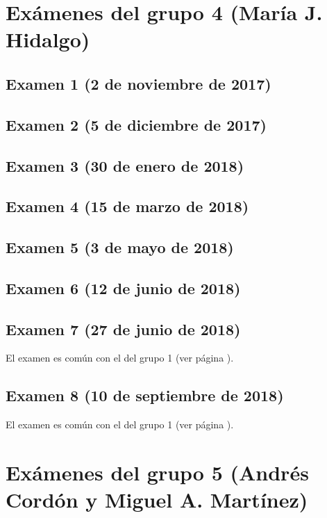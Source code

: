 \documentclass[a4paper,12pt,twoside]{book}
\begin{document}
\section{Exámenes del grupo 4 (María J. Hidalgo)}
\subsection{Examen 1 (2 de noviembre de 2017)}
\subsection{Examen 2 (5 de diciembre de 2017)}
\subsection{Examen 3 (30 de enero de 2018)}
 \label{examen_17_18_1_3}
\subsection{Examen 4 (15 de marzo de 2018)}
\subsection{Examen 5 (3 de mayo de 2018)}
\subsection{Examen 6 (12 de junio de 2018)} \label{examen_17_18_1_6}
\subsection{Examen 7 (27 de junio de 2018)}
El examen es común con el del grupo 1 (ver página \pageref{examen_17_18_4_7}).
\subsection{Examen 8 (10 de septiembre de 2018)}
El examen es común con el del grupo 1 (ver página \pageref{examen_17_18_4_8}).

\section{Exámenes del grupo 5 (Andrés Cordón y Miguel A. Martínez)}
\end{document}
